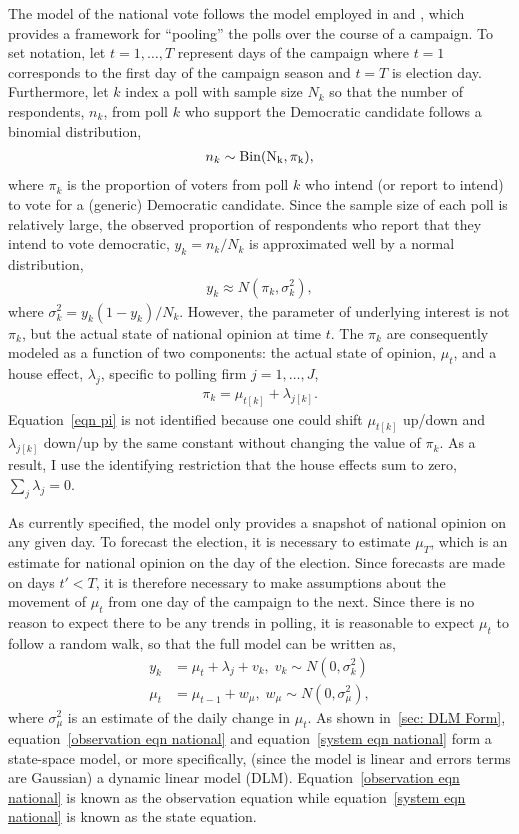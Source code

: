\documentclass[12pt,final,fleqn]{article}
\theoremstyle{plain}
\begin{document}
The model of the national vote follows the model employed in \citet{jackman2005pooling} and \citet{jackman2009bayesian}, which provides a framework for ``pooling'' the polls over the course of a campaign. To set notation, let $t=1,\ldots,T$ represent days of the campaign where $t=1$ corresponds to the first day of the campaign season and $t=T$ is election day. Furthermore, let $k$ index a poll with sample size $N_k$ so that the number of respondents, $n_k$, from poll $k$ who support the Democratic candidate follows a binomial distribution,
\begin{align}
n_k \sim \rm{Bin}(N_k, \pi_k),
\end{align}
where $\pi_k$ is the proportion of voters from poll $k$ who intend (or report to intend) to vote for a (generic) Democratic candidate. Since the sample size of each poll is relatively large, the observed proportion of respondents who report that they intend to vote democratic, $y_k = n_k/N_k$ is approximated well by a normal distribution,
\begin{align}
y_k \approx N(\pi_k, \sigma^2_k),
\end{align}
where $\sigma^2_k= y_k(1-y_k)/N_k$. However, the parameter of underlying interest is not $\pi_k$, but the actual state of national opinion at time $t$. The $\pi_k$ are consequently modeled as a function of two components: the actual state of opinion, $\mu_t$, and a house effect, $\lambda_j$, specific to polling firm $j = 1,\ldots, J$,
\begin{align} \label{eqn pi}
\pi_k = \mu_{t[k]} + \lambda_{j[k]}.
\end{align}
Equation~\ref{eqn pi} is not identified because one could shift $\mu_{t[k]}$ up/down and $\lambda_{j[k]}$ down/up by the same constant without changing the value of $\pi_k$. As a result, I use the identifying restriction that the house effects sum to zero, $\sum_j \lambda_j = 0$.

As currently specified, the model only provides a snapshot of national opinion on any given day. To forecast the election, it is necessary to estimate $\mu_T$, which is an estimate for national opinion on the day of the election. Since forecasts are made on days $t' <T$, it is therefore necessary to make assumptions about the movement of $\mu_t$ from one day of the campaign to the next. Since there is no reason to expect there to be any trends in polling, it is reasonable to expect $\mu_t$ to follow a random walk, so that the full model can be written as,
\begin{align}
\label{observation eqn national}
y_k &= \mu_{t} + \lambda_{j} + v_k, \; v_k\sim N(0, \sigma^2_k)\\ 
\label{system eqn national}
\mu_{t} &= \mu_{t-1} + w_\mu, \; w_\mu \sim N(0, \sigma^2_{\mu}),
\end{align}
where $\sigma^2_\mu$ is an estimate of the daily change in $\mu_t$. As shown in~\autoref{sec: DLM Form}, equation~\ref{observation eqn national} and equation~\ref{system eqn national} form a state-space model, or more specifically, (since the model is linear and errors terms are Gaussian) a dynamic linear model (DLM). Equation~\ref{observation eqn national} is known as the observation equation while equation~\ref{system eqn national} is known as the state equation. 
\end{document}
